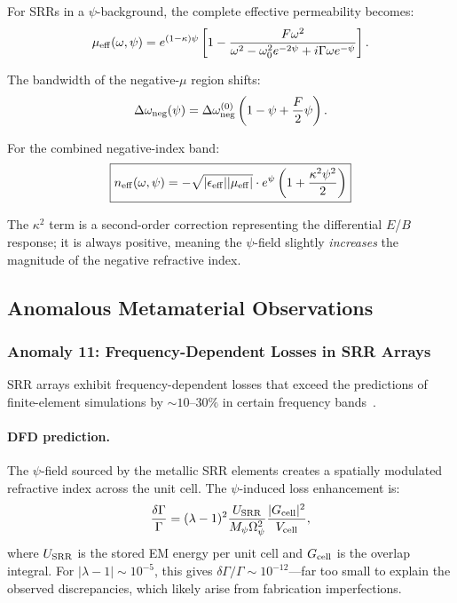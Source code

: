 \documentclass[aps,prb,twocolumn,superscriptaddress,floatfix,nofootinbib,longbibliography]{revtex4-2}
\newcommand{\Opsi}{\Omega_\psi}
\newcommand{\Mpsi}{M_\psi}
\begin{document}
For SRRs in a $\psi$-background, the complete effective permeability
becomes:
\begin{equation}
\mu_{\rm eff}(\omega,\psi) = e^{(1-\kappa)\psi}\left[
1 - \frac{F\omega^2}{\omega^2 - \omega_0^2 e^{-2\psi}
+ i\Gamma\omega e^{-\psi}}
\right].
\label{eq:mu-eff-full}
\end{equation}

The bandwidth of the negative-$\mu$ region shifts:
\begin{equation}
\Delta\omega_{\rm neg}(\psi) = \Delta\omega_{\rm neg}^{(0)}
\left(1 - \psi + \frac{F}{2}\psi\right).
\label{eq:bandwidth-psi}
\end{equation}

For the combined negative-index band:
\begin{equation}
\boxed{
n_{\rm eff}(\omega,\psi) = -\sqrt{|\epsilon_{\rm eff}||\mu_{\rm eff}|}
\cdot e^{\psi}
\left(1 + \frac{\kappa^2\psi^2}{2}\right)
}
\label{eq:n-eff-total}
\end{equation}

The $\kappa^2$ term is a second-order correction representing the
differential $E$/$B$ response; it is always positive, meaning the
$\psi$-field slightly \emph{increases} the magnitude of the negative
refractive index.

\subsection{Anomalous Metamaterial Observations}

\subsubsection{Anomaly 11: Frequency-Dependent Losses in SRR Arrays}

SRR arrays exhibit frequency-dependent losses that exceed the predictions
of finite-element simulations by $\sim 10$--$30\%$ in certain
frequency bands~\cite{Aydin2004,Kafesaki2007}.

\paragraph{DFD prediction.}
The $\psi$-field sourced by the metallic SRR elements creates a
spatially modulated refractive index across the unit cell.  The
$\psi$-induced loss enhancement is:
\begin{equation}
\frac{\delta\Gamma}{\Gamma} = (\lambda - 1)^2\frac{U_{\rm SRR}}
{\Mpsi\Opsi^2}\frac{|G_{\rm cell}|^2}{V_{\rm cell}},
\label{eq:srr-loss}
\end{equation}
where $U_{\rm SRR}$ is the stored EM energy per unit cell and
$G_{\rm cell}$ is the overlap integral.  For
$|\lambda - 1| \sim 10^{-5}$, this gives
$\delta\Gamma/\Gamma \sim 10^{-12}$---far too small to explain the
observed discrepancies, which likely arise from fabrication imperfections.
\end{document}
